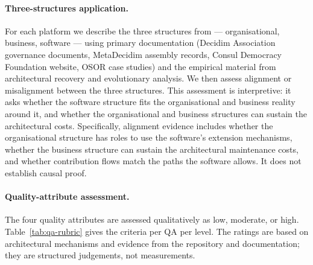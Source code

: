 \documentclass[11pt,a4paper]{article}
\begin{document}
\paragraph{Three-structures application.}
For each platform we describe the three structures from \citet{christensen2014analysis} --- organisational, business, software --- using primary documentation (Decidim Association governance documents, MetaDecidim assembly records, Consul Democracy Foundation website, OSOR case studies) and the empirical material from architectural recovery and evolutionary analysis. We then assess alignment or misalignment between the three structures. This assessment is interpretive: it asks whether the software structure fits the organisational and business reality around it, and whether the organisational and business structures can sustain the architectural costs. Specifically, alignment evidence includes whether the organisational structure has roles to use the software's extension mechanisms, whether the business structure can sustain the architectural maintenance costs, and whether contribution flows match the paths the software allows. It does not establish causal proof.

\paragraph{Quality-attribute assessment.}
The four quality attributes are assessed qualitatively as low, moderate, or high. Table~\ref{tab:qa-rubric} gives the criteria per QA per level. The ratings are based on architectural mechanisms and evidence from the repository and documentation; they are structured judgements, not measurements.
\end{document}
